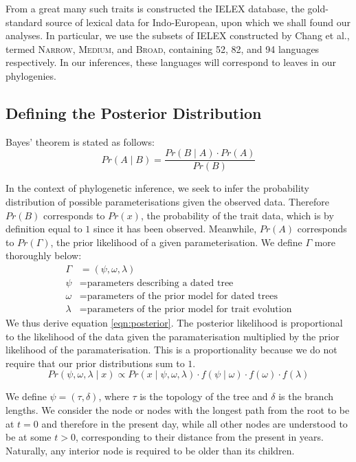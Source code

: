 \documentclass[10pt,journal,compsoc]{IEEEtran}
\begin{document}
From a great many such traits is constructed the IELEX database, the gold-standard source of lexical data for Indo-European, upon which we shall found our analyses. In particular, we use the subsets of IELEX constructed by Chang et al., termed \textsc{Narrow}, \textsc{Medium}, and \textsc{Broad}, containing 52, 82, and 94 languages respectively. In our inferences, these languages will correspond to leaves in our phylogenies.

\subsection{Defining the Posterior Distribution}

Bayes' theorem is stated as follows:
\begin{equation}
    Pr(A\;|\;B) = \frac{Pr(B\;|\;A) \cdot Pr(A)}{Pr(B)}
\end{equation}

In the context of phylogenetic inference, we seek to infer the probability distribution of possible parameterisations given the observed data. Therefore $Pr(B)$ corresponds to $Pr(x)$, the probability of the trait data, which is by definition equal to $1$ since it has been observed. Meanwhile, $Pr(A)$ corresponds to $Pr(\Gamma)$, the prior likelihood of a given parameterisation. We define $\Gamma$ more thoroughly below:
\begin{align*}
    \Gamma &= (\psi, \omega, \lambda)\\
    \psi   &= \text{parameters describing a dated tree}\\
    \omega &= \text{parameters of the prior model for dated trees}\\
    \lambda&= \text{parameters of the prior model for trait evolution}
\end{align*}
We thus derive equation \eqref{eqn:posterior}. The posterior likelihood is proportional to the likelihood of the data given the paramaterisation multiplied by the prior likelihood of the paramaterisation. This is a proportionality because we do not require that our prior distributions sum to $1$.
\begin{equation}\label{eqn:posterior}
    Pr(\psi, \omega, \lambda\;|\; x) \propto Pr(x\;|\;\psi, \omega, \lambda) \cdot f(\psi\;|\;\omega) \cdot f(\omega) \cdot f(\lambda)
\end{equation}

We define $\psi = (\tau, \delta)$, where $\tau$ is the topology of the tree and $\delta$ is the branch lengths. We consider the node or nodes with the longest path from the root to be at $t = 0$ and therefore in the present day, while all other nodes are understood to be at some $t > 0$, corresponding to their distance from the present in years. Naturally, any interior node is required to be older than its children.
\end{document}
